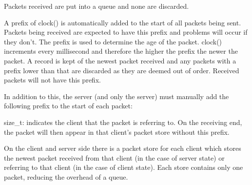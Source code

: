 \begin{Desc}
\begin{description}
Packets received are put into a queue and none are discarded.\par
\par
 \item[{\em 
\hypertarget{classcl_shared_protocol_a4b0b9c82b8ae4eee78c6308c35afd47babacdf5be8acea89eddc85f01f7b74018}{
UM\_\-PER\_\-CLIENT}
\label{classcl_shared_protocol_a4b0b9c82b8ae4eee78c6308c35afd47babacdf5be8acea89eddc85f01f7b74018}
}]A prefix of clock() is automatically added to the start of all packets being sent. Packets being received are expected to have this prefix and problems will occur if they don't. The prefix is used to determine the age of the packet. clock() increments every millisecond and therefore the higher the prefix the newer the packet. A record is kept of the newest packet received and any packets with a prefix lower than that are discarded as they are deemed out of order. Received packets will not have this prefix. \par
\par


In addition to this, the server (and only the server) must manually add the following prefix to the start of each packet:
\begin{DoxyItemize}
\item size\_\-t: indicates the client that the packet is referring to. On the receiving end, the packet will then appear in that client's packet store without this prefix.\par
\par

\end{DoxyItemize}

On the client and server side there is a packet store for each client which stores the newest packet received from that client (in the case of server state) or referring to that client (in the case of client state). Each store contains only one packet, reducing the overhead of a queue.\par
\par



\end{description}
\end{Desc}
